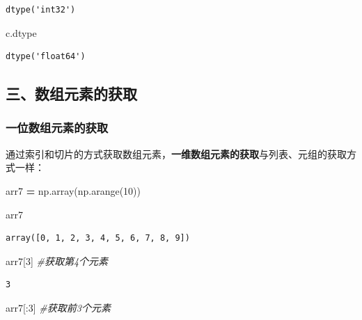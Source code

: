 \documentclass[]{article}
\newenvironment{Shaded}{\begin{snugshade}}{\end{snugshade}}
\newcommand{\DecValTok}[1]{\textcolor[rgb]{0.00,0.00,0.81}{#1}}
\newcommand{\CommentTok}[1]{\textcolor[rgb]{0.56,0.35,0.01}{\textit{#1}}}
\newcommand{\OperatorTok}[1]{\textcolor[rgb]{0.81,0.36,0.00}{\textbf{#1}}}
\newcommand{\NormalTok}[1]{#1}
\begin{document}
\begin{verbatim}
dtype('int32')
\end{verbatim}

\begin{Shaded}
\begin{Highlighting}[]
\NormalTok{c.dtype}
\end{Highlighting}
\end{Shaded}

\begin{verbatim}
dtype('float64')
\end{verbatim}

\subsection{三、数组元素的获取}

\subsubsection{一位数组元素的获取}

通过索引和切片的方式获取数组元素，\textbf{一维数组元素的获取}与列表、元组的获取方式一样：

\begin{Shaded}
\begin{Highlighting}[]
\NormalTok{arr7 }\OperatorTok{=}\NormalTok{ np.array(np.arange(}\DecValTok{10}\NormalTok{))}
\end{Highlighting}
\end{Shaded}

\begin{Shaded}
\begin{Highlighting}[]
\NormalTok{arr7}
\end{Highlighting}
\end{Shaded}

\begin{verbatim}
array([0, 1, 2, 3, 4, 5, 6, 7, 8, 9])
\end{verbatim}

\begin{Shaded}
\begin{Highlighting}[]
\NormalTok{arr7[}\DecValTok{3}\NormalTok{] }\CommentTok{#获取第4个元素}
\end{Highlighting}
\end{Shaded}

\begin{verbatim}
3
\end{verbatim}

\begin{Shaded}
\begin{Highlighting}[]
\NormalTok{arr7[:}\DecValTok{3}\NormalTok{] }\CommentTok{#获取前3个元素}
\end{Highlighting}
\end{Shaded}
\end{document}
